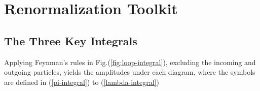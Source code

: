 \chapter{Renormalization Toolkit}
\section{The Three Key Integrals}
Applying Feynman's rules in Fig.(\ref{fig:loop-integral}), excluding the incoming and outgoing particles, yields the amplitudes under each diagram, where the symbols are defined in (\ref{pi-integral}) to (\ref{lambda-integral})
\begin{figure}[H]
    \centering
{} %

\begin{tikzpicture}[x=0.75pt,y=0.75pt,yscale=-1,xscale=1]


\end{tikzpicture}
\end{figure}
